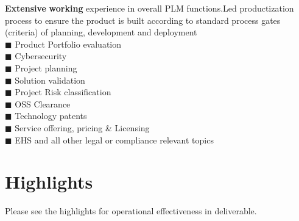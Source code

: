 \documentclass[]{cv-class}
\begin{document}
    \vspace{3mm} 
            { \textbf{Extensive} \textbf{working} experience in overall PLM functions.Led productization process to ensure the product is built according to standard process gates (criteria) of planning, development and deployment}\\
                                      $\blacksquare$ Product Portfolio evaluation\\
                                       $\blacksquare$ Cybersecurity\\
                                       $\blacksquare$ Project planning\\
                                       $\blacksquare$ Solution validation\\
                                       $\blacksquare$ Project Risk classification\\
                                       $\blacksquare$ OSS Clearance\\
                                       $\blacksquare$ Technology patents\\
                                       $\blacksquare$ Service offering, pricing \& Licensing\\
                                       $\blacksquare$ EHS and all other legal or compliance relevant topics\\
\section{Highlights}
Please see the highlights for operational effectiveness in deliverable.
\end{document}
